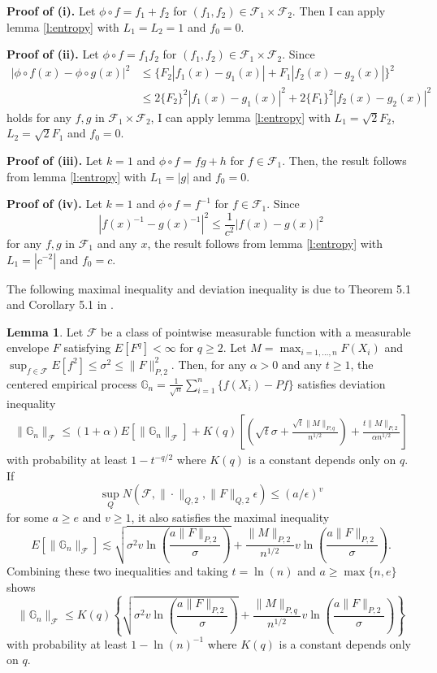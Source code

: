 \documentclass[12pt,oneside,reqno,english]{amsart}
\theoremstyle{definition}
\newtheorem{lemma}{Lemma}
\begin{document}
\textbf{Proof of (i).} 
Let $\phi\circ f=f_{1}+f_{2}$ for $(f_{1},f_{2})\in \mathcal{F}_{1}\times \mathcal{F}_{2}$. 
Then I can apply lemma \ref{l:entropy} with $L_{1}=L_{2}=1$ and $f_{0}=0$. 

\textbf{Proof of (ii).} 
Let $\phi\circ f=f_{1}f_{2}$ for $(f_{1},f_{2})\in \mathcal{F}_{1}\times \mathcal{F}_{2}$. Since  
\begin{align*}
|\phi\circ f(x)-\phi\circ g(x)|^{2}&\leq \{F_{2}|f_{1}(x)-g_{1}(x)|+F_{1}|f_{2}(x)-g_{2}(x)|\}^{2}\\ 
&\leq 2\{F_{2}\}^{2}|f_{1}(x)-g_{1}(x)|^{2}+2\{F_{1}\}^{2}|f_{2}(x)-g_{2}(x)|^{2}
\end{align*}
holds for any $f, g$ in $\mathcal{F}_{1}\times \mathcal{F}_{2}$, I can apply 
lemma \ref{l:entropy} with $L_{1}=\sqrt{2}F_{2}$, $L_{2}=\sqrt{2}F_{1}$ and $f_{0}=0$. 

\textbf{Proof of (iii).} 
Let $k=1$ and $\phi\circ f= fg+h$ for $f\in \mathcal{F}_{1}$. Then, the result follows from 
lemma \ref{l:entropy} with $L_{1}=|g|$ and $f_{0}=0$.  

\textbf{Proof of (iv).} 
Let $k=1$ and $\phi\circ f= f^{-1}$ for $f\in \mathcal{F}_{1}$.
Since 
\[|f(x)^{-1}-g(x)^{-1}|^{2}\leq \frac{1}{c^{2}}|f(x)-g(x)|^{2}\]
for any $f, g$ in $\mathcal{F}_{1}$ and any $x$, 
the result follows from lemma \ref{l:entropy} with $L_{1}=|c^{-2}|$ and $f_{0}=c$.  


The following maximal inequality and deviation inequality is due to Theorem 5.1 and Corollary 5.1 in \cite{CCK:14}. 
\begin{lemma}\label{l:deviation}
Let $\mathcal{F}$ be a class of pointwise measurable function with a measurable envelope $F$ satisfying $E[F^{q}]<\infty$ for $q\geq 2$. 
Let $M=\max_{i=1,...,n}F(X_{i})$ and $\sup_{f\in \mathcal{F}}E[f^{2}]\leq \sigma^{2}\leq \|F\|_{P,2}^{2}$. 
Then, for any $\alpha>0$ and any $t\geq 1$,
 the centered empirical process $\mathbb{G}_{n}=\frac{1}{\sqrt{n}}\sum_{i=1}^{n}\{f(X_{i})-Pf\}$ satisfies deviation inequality 
\begin{align*}
\|\mathbb{G}_{n}\|_{\mathcal{F}}\leq (1+\alpha)E[\|\mathbb{G}_{n}\|_{\mathcal{F}}]+K(q)\left[(\sqrt{t}\sigma+\frac{\sqrt{t}\|M\|_{P,q}}{n^{1/2}})+
\frac{t\|M\|_{P,2}}{\alpha n^{1/2}}\right]
\end{align*}
 with probability at least $1-t^{-q/2}$ where $K(q)$ is a constant depends only on $q$.
 If 
\[\sup_{Q}N(\mathcal{F},\|\cdot\|_{Q,2},\|F\|_{Q,2}\epsilon)\leq (a/\epsilon)^{v}\]
for some $a\geq e$ and $v\geq 1$, it also satisfies the maximal inequality
\[E[\|\mathbb{G}_{n}\|_{\mathcal{F}}]\lesssim  \sqrt{\sigma^{2} v\ln\left(\frac{ a\|F\|_{P,2}}{\sigma}\right)}+\frac{\|M\|_{P,2}}{n^{1/2}}v\ln\left(\frac{ a\|F\|_{P,2}}{\sigma}\right).\]
Combining these two inequalities and taking $t=\ln (n)$ and $a\geq \max\{n,e\}$ shows 
\[\|\mathbb{G}_{n}\|_{\mathcal{F}}\leq K(q)\left\{\sqrt{\sigma^{2} v\ln\left(\frac{ a\|F\|_{P,2}}{\sigma}\right)}+\frac{\|M\|_{P,q}}{n^{1/2}}v\ln\left(\frac{ a\|F\|_{P,2}}{\sigma}\right)\right\}\]
with probability at least $1-\ln(n)^{-1}$ where $K(q)$ is a constant depends only on $q$. 
\end{lemma}
\end{document}
